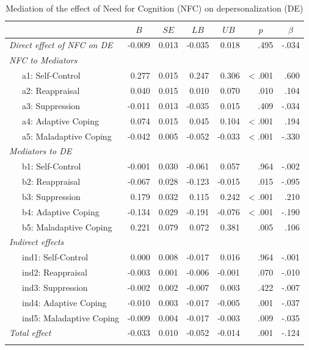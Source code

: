 \documentclass[
  english,
  man]{apa6}
\begin{document}
\begin{table}[tbp]

\begin{center}
\begin{threeparttable}

\caption{\label{tab:RQ6}Mediation of the effect of Need for Cognition (NFC) on depersonalization (DE)}

\footnotesize{

\begin{tabular}{lrrrrrr}
\toprule
 & \multicolumn{1}{c}{$B$} & \multicolumn{1}{c}{$SE$} & \multicolumn{1}{c}{$LB$} & \multicolumn{1}{c}{$UB$} & \multicolumn{1}{c}{$p$} & \multicolumn{1}{c}{$\beta$}\\
\midrule
\textit{Direct effect of NFC on DE} & -0.009 & 0.013 & -0.035 & 0.018 & .495 & -.034\\ \midrule
\textit{NFC to Mediators} &  &  &  &  &  & \\
\ \ \ a1: Self-Control & 0.277 & 0.015 & 0.247 & 0.306 & < .001 & .600\\
\ \ \ a2: Reappraisal & 0.040 & 0.015 & 0.010 & 0.070 & .010 & .104\\
\ \ \ a3: Suppression & -0.011 & 0.013 & -0.035 & 0.015 & .409 & -.034\\
\ \ \ a4: Adaptive Coping & 0.074 & 0.015 & 0.045 & 0.104 & < .001 & .194\\
\ \ \ a5: Maladaptive Coping & -0.042 & 0.005 & -0.052 & -0.033 & < .001 & -.330\\ \midrule
\textit{Mediators to DE} &  &  &  &  &  & \\
\ \ \ b1: Self-Control & -0.001 & 0.030 & -0.061 & 0.057 & .964 & -.002\\
\ \ \ b2: Reappraisal & -0.067 & 0.028 & -0.123 & -0.015 & .015 & -.095\\
\ \ \ b3: Suppression & 0.179 & 0.032 & 0.115 & 0.242 & < .001 & .210\\
\ \ \ b4: Adaptive Coping & -0.134 & 0.029 & -0.191 & -0.076 & < .001 & -.190\\
\ \ \ b5: Maladaptive Coping & 0.221 & 0.079 & 0.072 & 0.381 & .005 & .106\\ \midrule
\textit{Indirect effects} &  &  &  &  &  & \\
\ \ \ ind1: Self-Control & 0.000 & 0.008 & -0.017 & 0.016 & .964 & -.001\\
\ \ \ ind2: Reappraisal & -0.003 & 0.001 & -0.006 & -0.001 & .070 & -.010\\
\ \ \ ind3: Suppression & -0.002 & 0.002 & -0.007 & 0.003 & .422 & -.007\\
\ \ \ ind4: Adaptive Coping & -0.010 & 0.003 & -0.017 & -0.005 & .001 & -.037\\
\ \ \ ind5: Maladaptive Coping & -0.009 & 0.004 & -0.017 & -0.003 & .009 & -.035\\ \midrule
\textit{Total effect} & -0.033 & 0.010 & -0.052 & -0.014 & .001 & -.124\\
\bottomrule
\addlinespace
\end{tabular}

}
\end{threeparttable}
\end{center}
\end{table}
\end{document}
